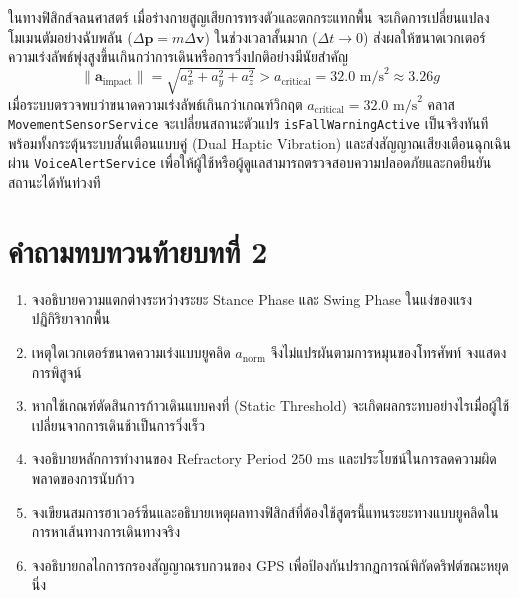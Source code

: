 ในทางฟิสิกส์จลนศาสตร์ เมื่อร่างกายสูญเสียการทรงตัวและตกกระแทกพื้น จะเกิดการเปลี่ยนแปลงโมเมนตัมอย่างฉับพลัน ($\Delta \mathbf{p} = m \Delta \mathbf{v}$) ในช่วงเวลาสั้นมาก ($\Delta t \to 0$) ส่งผลให้ขนาดเวกเตอร์ความเร่งลัพธ์พุ่งสูงขึ้นเกินกว่าการเดินหรือการวิ่งปกติอย่างมีนัยสำคัญ
\begin{equation}
\|\mathbf{a}_{\text{impact}}\| = \sqrt{a_x^2 + a_y^2 + a_z^2} > a_{\text{critical}} = 32.0\text{ m/s}^2 \approx 3.26g
\end{equation}
เมื่อระบบตรวจพบว่าขนาดความเร่งลัพธ์เกินกว่าเกณฑ์วิกฤต $a_{\text{critical}} = 32.0\text{ m/s}^2$ คลาส \texttt{MovementSensorService} จะเปลี่ยนสถานะตัวแปร \texttt{isFallWarningActive} เป็นจริงทันที พร้อมทั้งกระตุ้นระบบสั่นเตือนแบบคู่ (Dual Haptic Vibration) และส่งสัญญาณเสียงเตือนฉุกเฉินผ่าน \texttt{VoiceAlertService} เพื่อให้ผู้ใช้หรือผู้ดูแลสามารถตรวจสอบความปลอดภัยและกดยืนยันสถานะได้ทันท่วงที

\section*{คำถามทบทวนท้ายบทที่ 2}
\begin{enumerate}
    \item จงอธิบายความแตกต่างระหว่างระยะ Stance Phase และ Swing Phase ในแง่ของแรงปฏิกิริยาจากพื้น
    \item เหตุใดเวกเตอร์ขนาดความเร่งแบบยูคลิด $a_{\text{norm}}$ จึงไม่แปรผันตามการหมุนของโทรศัพท์ จงแสดงการพิสูจน์
    \item หากใช้เกณฑ์ตัดสินการก้าวเดินแบบคงที่ (Static Threshold) จะเกิดผลกระทบอย่างไรเมื่อผู้ใช้เปลี่ยนจากการเดินช้าเป็นการวิ่งเร็ว
    \item จงอธิบายหลักการทำงานของ Refractory Period $250\text{ ms}$ และประโยชน์ในการลดความผิดพลาดของการนับก้าว
    \item จงเขียนสมการฮาเวอร์ซีนและอธิบายเหตุผลทางฟิสิกส์ที่ต้องใช้สูตรนี้แทนระยะทางแบบยูคลิดในการหาเส้นทางการเดินทางจริง
    \item จงอธิบายกลไกการกรองสัญญาณรบกวนของ GPS เพื่อป้องกันปรากฏการณ์พิกัดดริฟต์ขณะหยุดนิ่ง
\end{enumerate}
\clearpage
